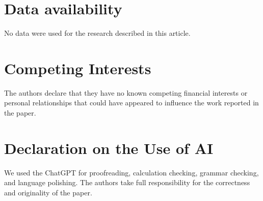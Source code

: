 \documentclass[11pt,reqno]{amsart}
\theoremstyle{definition}
\theoremstyle{remark}
\begin{document}
\medskip



\medskip

\section*{Data availability}

No data were used for the research described in this article.

\section*{Competing Interests}
The authors declare that they have no known competing financial interests or
personal relationships that could have appeared to influence the work reported in
the paper.

\section*{Declaration on the Use of AI}
We used the ChatGPT for  proofreading, calculation checking, grammar checking, and language polishing.  The authors take full
responsibility for the correctness and originality of the paper. 
\end{document}
